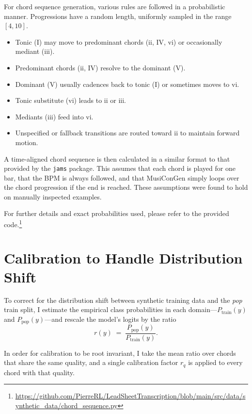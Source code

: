For chord sequence generation, various rules are followed in a probabilistic manner. Progressions have a random length, uniformly sampled in the range $[4, 10]$.

\begin{itemize}
    \item Tonic (I) may move to predominant chords (ii, IV, vi) or occasionally mediant (iii).
    \item Predominant chords (ii, IV) resolve to the dominant (V).
    \item Dominant (V) usually cadences back to tonic (I) or sometimes moves to vi.
    \item Tonic substitute (vi) leads to ii or iii.
    \item Mediants (iii) feed into vi.
    \item Unspecified or fallback transitions are routed toward ii to maintain forward motion.
\end{itemize}

A time-aligned chord sequence is then calculated in a similar format to that provided by the \texttt{jams} package. This assumes that each chord is played for one bar, that the BPM is always followed, and that MusiConGen simply loops over the chord progression if the end is reached. These assumptions were found to hold on manually inspected examples.

For further details and exact probabilities used, please refer to the provided code.\footnote{\url{https://github.com/PierreRL/LeadSheetTranscription/blob/main/src/data/synthetic_data/chord_sequence.py}}

\section{Calibration to Handle Distribution Shift}\label{app:calibration}

To correct for the distribution shift between synthetic training data and the \emph{pop} train split, I estimate the empirical class probabilities in each domain---\(P_{\text{train}}(y)\) and \(P_{\text{pop}}(y)\)---and rescale the model’s logits by the ratio
\begin{equation}
r(y)\;=\;\frac{P_{\text{pop}}(y)}{P_{\text{train}}(y)}.
\end{equation}

In order for calibration to be root invariant, I take the mean ratio over chords that share the same quality, and a single calibration factor \(r_q\) is applied to every chord with that quality.

